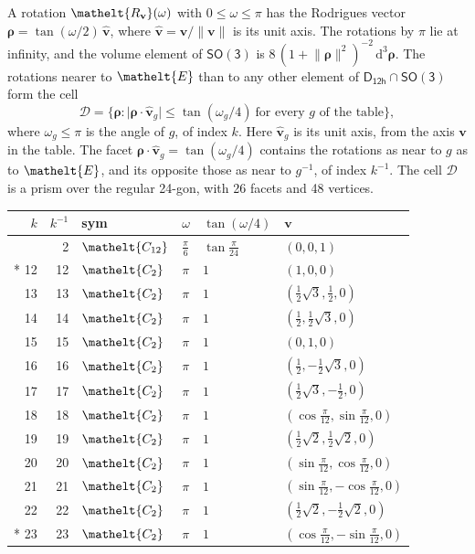\documentclass[10pt,a4paper]{article}
\numberwithin{equation}{section}
\newcommand{\eltfont}[1]{{\let\sigma\eltsigma\mathelt{#1}}}
\newcommand{\grp}[1]{\mathsf{#1}}
\newcommand{\cls}[1]{\eltfont{#1}}
\newcommand{\elt}[1]{\eltfont{#1}}
\newcommand{\dirvec}[3]{(#1, #2, #3)}
\newcommand{\unitaxis}{\hat{\mathbf{v}}}
\newcommand{\vv}{\mathbf{v}}
\newcommand{\diff}{\mathrm{d}}
\newcommand{\rodrigues}{\boldsymbol{\rho}}
\newcommand{\fcell}{\mathcal{D}}
\begin{document}
\leavevmode\label{n:vector.rodrigues}\label{n:vector.unitaxis}A rotation $\elt{R_{\vv}}(\omega)$ with $0 \le \omega \le \pi$ has the Rodrigues vector $\rodrigues = \tan(\omega/2)\,\unitaxis$, where $\unitaxis = \vv/\lVert\vv\rVert$ is its unit axis. The rotations by $\pi$ lie at infinity, and the volume element of \href{SO3.pdf}{$\grp{SO(3)}$} is $8\,(1 + \lVert\rodrigues\rVert^2)^{-2}\,\diff^3\rodrigues$.
\leavevmode\label{n:set.cell}The rotations nearer to $\elt{E}$ than to any other element of $\grp{D_{12h}} \cap \grp{SO(3)}$ form the cell
\begin{equation}\label{e:cell}\fcell = \bigl\{\rodrigues : \lvert\rodrigues\cdot\unitaxis_g\rvert \le \tan(\omega_g/4)\ \text{for every $g$ of the table}\bigr\},\end{equation}
where $\omega_g \le \pi$ is the angle of $g$, of index $k$. Here $\unitaxis_g$ is its unit axis, from the axis $\vv$ in the table. The facet $\rodrigues\cdot\unitaxis_g = \tan(\omega_g/4)$ contains the rotations as near to $g$ as to $\elt{E}$, and its opposite those as near to $g^{-1}$, of index $k^{-1}$. The cell $\fcell$ is a prism over the regular 24-gon, with 26 facets and 48 vertices.
{\small{\renewcommand{\arraystretch}{1.3}\begin{longtable}{@{}rrllll@{}}\toprule
$k$ & $k^{-1}$ & sym & $\omega$ & $\tan(\omega/4)$ & $\vv$\\\midrule\endhead
\bottomrule\endfoot\endlastfoot
1 & 2 & $\cls{C_{12}}$ & $\tfrac{\pi}{6}$ & $\tan\tfrac{\pi}{24}$ & $\dirvec{0}{0}{1}$\\*
12 & 12 & $\cls{C_{2}}$ & $\pi$ & $1$ & $\dirvec{1}{0}{0}$\\
13 & 13 & $\cls{C_{2}}$ & $\pi$ & $1$ & $\dirvec{\tfrac{1}{2}\sqrt{3}}{\tfrac{1}{2}}{0}$\\
14 & 14 & $\cls{C_{2}}$ & $\pi$ & $1$ & $\dirvec{\tfrac{1}{2}}{\tfrac{1}{2}\sqrt{3}}{0}$\\
15 & 15 & $\cls{C_{2}}$ & $\pi$ & $1$ & $\dirvec{0}{1}{0}$\\
16 & 16 & $\cls{C_{2}}$ & $\pi$ & $1$ & $\dirvec{\tfrac{1}{2}}{-\tfrac{1}{2}\sqrt{3}}{0}$\\
17 & 17 & $\cls{C_{2}}$ & $\pi$ & $1$ & $\dirvec{\tfrac{1}{2}\sqrt{3}}{-\tfrac{1}{2}}{0}$\\
18 & 18 & $\cls{C_{2}}$ & $\pi$ & $1$ & $\dirvec{\cos\tfrac{\pi}{12}}{\sin\tfrac{\pi}{12}}{0}$\\
19 & 19 & $\cls{C_{2}}$ & $\pi$ & $1$ & $\dirvec{\tfrac{1}{2}\sqrt{2}}{\tfrac{1}{2}\sqrt{2}}{0}$\\
20 & 20 & $\cls{C_{2}}$ & $\pi$ & $1$ & $\dirvec{\sin\tfrac{\pi}{12}}{\cos\tfrac{\pi}{12}}{0}$\\
21 & 21 & $\cls{C_{2}}$ & $\pi$ & $1$ & $\dirvec{\sin\tfrac{\pi}{12}}{-\cos\tfrac{\pi}{12}}{0}$\\
22 & 22 & $\cls{C_{2}}$ & $\pi$ & $1$ & $\dirvec{\tfrac{1}{2}\sqrt{2}}{-\tfrac{1}{2}\sqrt{2}}{0}$\\*
23 & 23 & $\cls{C_{2}}$ & $\pi$ & $1$ & $\dirvec{\cos\tfrac{\pi}{12}}{-\sin\tfrac{\pi}{12}}{0}$\\
\bottomrule\end{longtable}}}
\end{document}

